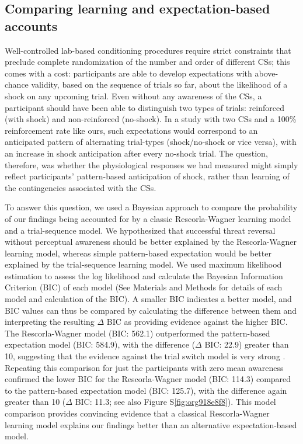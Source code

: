 \documentclass[12pt]{article}
\begin{document}
\subsection*{Comparing learning and expectation-based accounts}
\label{sec:orgae0bf98}
Well-controlled lab-based conditioning procedures require strict
constraints that preclude complete randomization of the number and order
of different CSs; this comes with a cost: participants are able to
develop expectations with above-chance validity, based on the sequence
of trials so far, about the likelihood of a shock on any upcoming
trial. Even without any awareness of the CSs, a participant should have
been able to distinguish two types of trials: reinforced (with shock)
and non-reinforced (no-shock). In a study with two CSs and a 100\%
reinforcement rate like ours, such expectations would correspond to an
anticipated pattern of alternating trial-types (shock/no-shock or vice
versa), with an increase in shock anticipation after every no-shock
trial. The question, therefore, was whether the physiological responses
we had measured might simply reflect participants' pattern-based
anticipation of shock, rather than learning of the contingencies
associated with the CSs.

To answer this question, we used a Bayesian approach to compare the
probability of our findings being accounted for by a classic
Rescorla-Wagner learning model \cite{Rescorla1972} and a
trial-sequence model. We hypothesized that successful threat reversal
without perceptual awareness should be better explained by the
Rescorla-Wagner learning model, whereas simple pattern-based expectation
would be better explained by the trial-sequence learning model. We used
maximum likelihood estimation to assess the log likelihood and calculate
the Bayesian Information Criterion (BIC) of each model (See Materials
and Methods for details of each model and calculation of the BIC). A
smaller BIC indicates a better model, and BIC values can thus be
compared by calculating the difference between them and interpreting the
resulting \(\Delta\) BIC as providing evidence against the higher BIC. The
Rescorla-Wagner model (BIC: 562.1) outperformed the pattern-based
expectation model (BIC: 584.9), with the difference (\(\Delta\) BIC: 22.9)
greater than 10, suggesting that the evidence against the trial
switch model is very strong \cite{Raftery1995}. Repeating this
comparison for just the participants with zero mean awareness confirmed
the lower BIC for the Rescorla-Wagner model (BIC: 114.3) compared to the
pattern-based expectation model (BIC: 125.7), with the difference again
greater than 10 (\(\Delta\) BIC: 11.3; see also
Figure S\ref{fig:org918e8f8}). This model comparison provides convincing
evidence that a classical Rescorla-Wagner learning model explains our
findings better than an alternative expectation-based model.
\end{document}

